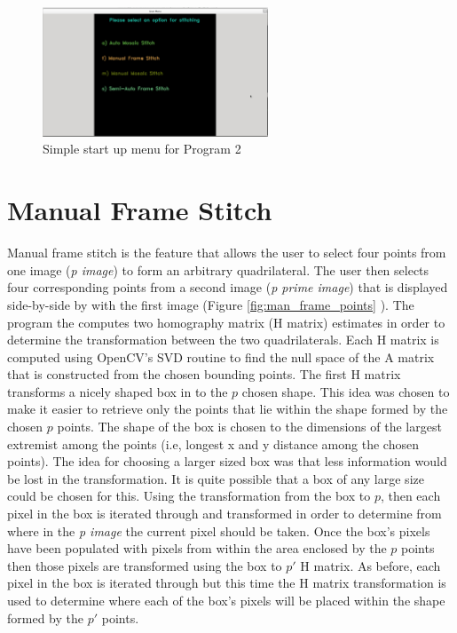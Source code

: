 \documentclass[10pt,twocolumn,letterpaper]{article}
\begin{document}
\begin{figure}[ht!]
\centering
\includegraphics[width=0.6\textwidth]{img/prog_2_menu.eps}
\caption{Simple start up menu for Program 2}
\label{fig:menu}
\end{figure}

\section{ Manual Frame Stitch }
Manual frame stitch is the feature that allows the user to select four points from one image (\emph{p image}) to form an arbitrary quadrilateral. The user then selects four corresponding points from a second image (\emph{p prime image}) that is displayed side-by-side by with the first image (Figure \ref{fig:man_frame_points} ). The program the computes two homography matrix (H matrix) estimates in order to determine the transformation between the two quadrilaterals. Each H matrix is computed using OpenCV's SVD routine to find the null space of the A matrix that is constructed from the chosen bounding points. The first H matrix transforms a nicely shaped box in to the $p$ chosen shape. This idea was chosen to make it easier to retrieve only the points that lie within the shape formed by the chosen $p$ points. The shape of the box is chosen to the dimensions of the largest extremist among the points (i.e, longest x and y distance among the chosen points). The idea for choosing a larger sized box was that less information would be lost in the transformation. It is quite possible that a box of any large size could be chosen for this. Using the transformation from the box to $p$, then each pixel in the box is iterated through and transformed in order to determine from where in the \emph{p image} the current pixel should be taken. Once the box's pixels have been populated with pixels from within the area enclosed by the $p$ points then those pixels are transformed using the box to $p'$ H matrix. As before, each pixel in the box is iterated through but this time the H matrix transformation is used to determine where each of the box's pixels will be placed within the shape formed by the $p'$ points.
\end{document}
